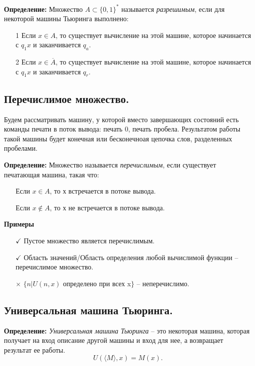 \textbf{Определение: } Множество $A \subset \{0,1\}^*$ называется \textit{разрешимым}, если для некоторой машины Тьюринга выполнено:
\begin{itemize}
    \item[1] Если $x \in A$, то существует вычисление на этой машине, которое начинается с $q_1x$ и заканчивается $q_a$.
    \item[2] Если $x \in \overline{A}$, то существует вычисление на этой машине, которое начинается с $q_1x$ и заканчивается $q_r$.
\end{itemize}

\subsection{Перечислимое множество.}

Будем рассматривать машину, у которой вместо завершающих состояний есть команды печати в поток вывода: печать 0, печать пробела. Результатом работы такой машины будет конечная или бесконечноая цепочка слов, разделенных пробелами.

\textbf{Определение: } Множество называется \textit{перечислимым}, если существует печатающая машина, такая что:
\begin{itemize}
    \item[] Если $x \in A$, то х встречается в потоке вывода.
    \item[] Если $x \not\in A$, то х не встречается в потоке вывода.
\end{itemize}

\textbf{Примеры}
\begin{itemize}
    \item [$\checkmark$] Пустое множество является перечислимым.
    \item [$\checkmark$] Область значений/Область определения любой вычислимой функции -- перечислимое множество.
    \item [$\times$] $\{n | U(n, x)$ определено при всех x$\}$ -- неперечислимо.
\end{itemize}

\subsection{Универсальная машина Тьюринга.}

\textbf{Определение: } \textit{Универсальная машина Тьюринга} -- это некоторая машина, которая получает на вход описание другой машины и вход для нее, а возвращает результат ее работы.
\[U(\langle M \rangle, x) = M(x).\]

